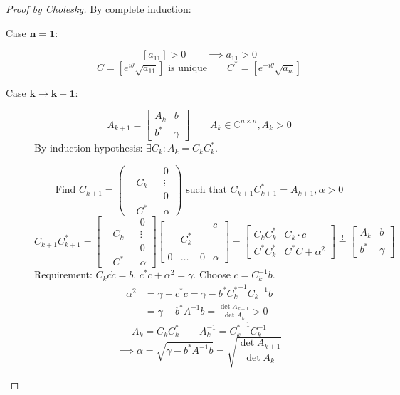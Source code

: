 \documentclass[a4paper]{article}
\numberwithin{lecref}{section}
\begin{document}
\begin{proof}[Proof by Cholesky]
  By complete induction:
  \begin{description}
    \item[Case $\mathbf{n = 1}$:]
      \[
        [a_{11}] > 0
        \qquad \implies a_{11} > 0
      \]\[
        C = [ e^{i\theta} \sqrt{a_{11}}] \text{ is unique} \qquad
        C^* = [e^{-i\theta} \sqrt{a_n}]
      \]
    \item[Case $\mathbf{k \to k+1}$:]
      \[ A_{k+1} = \begin{bmatrix} A_k & b \\ b^* & \gamma \end{bmatrix} \qquad A_k \in \mathbb C^{n \times n}, A_k > 0 \]
      By induction hypothesis:
      $\exists C_k: A_k = C_k C_k^*$.

      \[ \text{Find } C_{k+1} = \begin{pmatrix} &  & & 0 \\ & C_k & & \vdots \\ & & & 0 \\ & C^* & & \alpha \end{pmatrix} \text{ such that } C_{k+1} C_{k+1}^* = A_{k+1}, \alpha > 0 \]
      \[ C_{k+1} C_{k+1}^* = \begin{bmatrix} &  & & 0 \\ & C_k & & \vdots \\ & & & 0 \\ & C^* & & \alpha \end{bmatrix} \begin{bmatrix} &  & & c \\ & C_k^* & & \\ & & & \\ 0 & \dots & 0 & \alpha \end{bmatrix} = \left[\begin{array}{c|c} C_k C_k^* & C_k \cdot c \\ C^* C_k^* & C^* C + \alpha^2 \end{array}\right]  \overset!= \begin{bmatrix} A_k & b \\ b^* & \gamma \end{bmatrix} \]
      Requirement: $C_k c\dot c = b$. $c^* c + \alpha^2 = \gamma$.
      Choose $c = C_k^{-1} b$.
      \begin{align*}
        \alpha^2 &= \gamma - c^* c
          = \gamma - b^* {C_k^*}^{-1} {C_k}^{-1} b  \\
          &= \gamma - b^* A^{-1} b
          = \frac{\det{A_{k+1}}}{\det{A_k}} > 0
      \end{align*}
      \[ A_k = C_k C^*_k \qquad A_k^{-1} = {C_k^*}^{-1} C_k^{-1} \]
      \[ \implies \alpha = \sqrt{\gamma - b^* A^{-1} b} = \sqrt{\frac{\det{A_{k+1}}}{\det{A_k}}} \]
  \end{description}
\end{proof}
\end{document}
